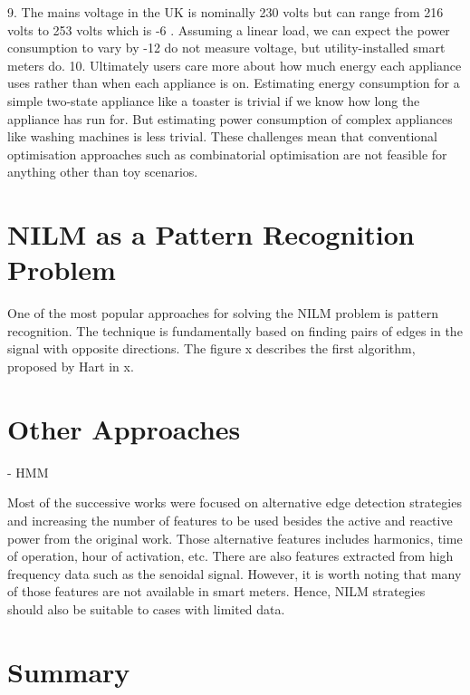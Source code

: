 9. The mains voltage in the UK is nominally 230 volts but can range from 216 volts to
253 volts which is -6%
. Assuming a linear
load, we can expect the power consumption to vary by -12%
do not measure voltage, but utility-installed smart meters do.
10. Ultimately users care more about how much energy each appliance uses rather than when
each appliance is on. Estimating energy consumption for a simple two-state appliance
like a toaster is trivial if we know how long the appliance has run for. But estimating
power consumption of complex appliances like washing machines is less trivial.
These challenges mean that conventional optimisation approaches such as combinatorial optimisation
are not feasible for anything other than toy scenarios.


\fi

\section{NILM as a Pattern Recognition Problem}
One of the most popular approaches for solving the NILM problem is pattern recognition. The technique is fundamentally based on finding pairs of edges in the signal with opposite directions. The figure x describes the first algorithm, proposed by Hart in x. 

\section{Other Approaches}
- HMM


Most of the successive works were focused on alternative edge detection strategies and increasing the number of features to be used besides the active and reactive power from the original work. Those alternative features includes harmonics, time of operation, hour of activation, etc. There are also features extracted from high frequency data such as the senoidal signal. However, it is worth noting that many of those features are not available in smart meters. Hence, NILM strategies should also be suitable to cases with limited data. 

\section{Summary}